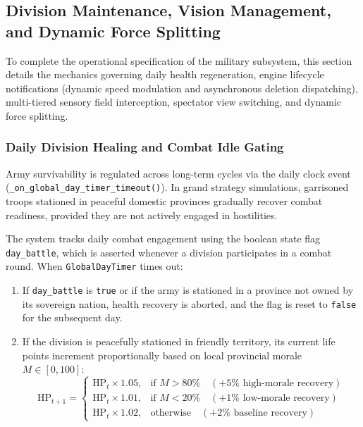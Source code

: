 \subsection{Division Maintenance, Vision Management, and Dynamic Force Splitting}
\label{subsec:army_lifecycle_vision_split}

To complete the operational specification of the military subsystem, this section details the mechanics governing daily health regeneration, engine lifecycle notifications (dynamic speed modulation and asynchronous deletion dispatching), multi-tiered sensory field interception, spectator view switching, and dynamic force splitting.

\subsubsection{Daily Division Healing and Combat Idle Gating}
Army survivability is regulated across long-term cycles via the daily clock event (\texttt{\_on\_global\_day\_timer\_timeout()}). In grand strategy simulations, garrisoned troops stationed in peaceful domestic provinces gradually recover combat readiness, provided they are not actively engaged in hostilities.

The system tracks daily combat engagement using the boolean state flag \texttt{day\_battle}, which is asserted whenever a division participates in a combat round. When \texttt{GlobalDayTimer} times out:
\begin{enumerate}
    \item If \texttt{day\_battle} is \texttt{true} or if the army is stationed in a province not owned by its sovereign nation, health recovery is aborted, and the flag is reset to \texttt{false} for the subsequent day.
    \item If the division is peacefully stationed in friendly territory, its current life points increment proportionally based on local provincial morale $M \in [0, 100]$:
    \begin{equation}
        \text{HP}_{t+1} = \begin{cases}
            \text{HP}_t \times 1.05, & \text{if } M > 80\% \quad (+5\% \text{ high-morale recovery}) \\
            \text{HP}_t \times 1.01, & \text{if } M < 20\% \quad (+1\% \text{ low-morale recovery}) \\
            \text{HP}_t \times 1.02, & \text{otherwise} \quad (+2\% \text{ baseline recovery})
        \end{cases}
    \end{equation}
\end{enumerate}

